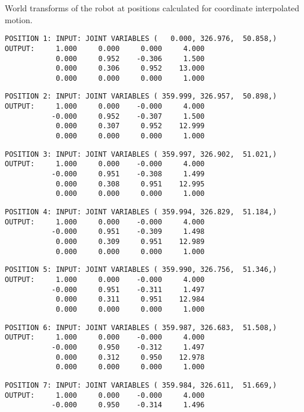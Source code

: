 \newpage
World transforms of the robot at positions calculated for coordinate interpolated motion.
\begin{verbatim}
POSITION 1: INPUT: JOINT VARIABLES (   0.000, 326.976,  50.858,)
OUTPUT:     1.000     0.000     0.000     4.000
            0.000     0.952    -0.306     1.500
            0.000     0.306     0.952    13.000
            0.000     0.000     0.000     1.000
\end{verbatim} \pagebreak[1]\begin{verbatim}
POSITION 2: INPUT: JOINT VARIABLES ( 359.999, 326.957,  50.898,)
OUTPUT:     1.000     0.000    -0.000     4.000
           -0.000     0.952    -0.307     1.500
            0.000     0.307     0.952    12.999
            0.000     0.000     0.000     1.000
\end{verbatim} \pagebreak[1]\begin{verbatim}
POSITION 3: INPUT: JOINT VARIABLES ( 359.997, 326.902,  51.021,)
OUTPUT:     1.000     0.000    -0.000     4.000
           -0.000     0.951    -0.308     1.499
            0.000     0.308     0.951    12.995
            0.000     0.000     0.000     1.000
\end{verbatim} \pagebreak[1]\begin{verbatim}
POSITION 4: INPUT: JOINT VARIABLES ( 359.994, 326.829,  51.184,)
OUTPUT:     1.000     0.000    -0.000     4.000
           -0.000     0.951    -0.309     1.498
            0.000     0.309     0.951    12.989
            0.000     0.000     0.000     1.000
\end{verbatim} \pagebreak[1]\begin{verbatim}
POSITION 5: INPUT: JOINT VARIABLES ( 359.990, 326.756,  51.346,)
OUTPUT:     1.000     0.000    -0.000     4.000
           -0.000     0.951    -0.311     1.497
            0.000     0.311     0.951    12.984
            0.000     0.000     0.000     1.000
\end{verbatim} \pagebreak[1]\begin{verbatim}
POSITION 6: INPUT: JOINT VARIABLES ( 359.987, 326.683,  51.508,)
OUTPUT:     1.000     0.000    -0.000     4.000
           -0.000     0.950    -0.312     1.497
            0.000     0.312     0.950    12.978
            0.000     0.000     0.000     1.000
\end{verbatim} \pagebreak[1]\begin{verbatim}
POSITION 7: INPUT: JOINT VARIABLES ( 359.984, 326.611,  51.669,)
OUTPUT:     1.000     0.000    -0.000     4.000
           -0.000     0.950    -0.314     1.496

\end{verbatim}
